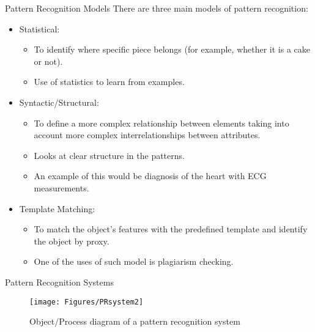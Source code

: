 \begin{frame}{Pattern Recognition Models}
There are three main models of pattern recognition:
\setlength{\itemsep}{12pt}
\begin{itemize}
\item {\color{mycolor1}Statistical:} 
\begin{itemize}
\item To identify where specific piece belongs (for example, whether it is a cake or not).
\item Use of statistics to learn from examples.
\end{itemize}
\item {\color{mycolor1}Syntactic/Structural:} 
\begin{itemize}
\item To define a more complex relationship between elements taking into account more complex interrelationships between attributes.
\item Looks at clear structure in the patterns.
\item An example of this would be diagnosis of the heart with ECG measurements.
\end{itemize}
\item {\color{mycolor1}Template Matching:}
\begin{itemize}
\item To match the object's features with the predefined template and identify the object by proxy. 
\item One of the uses of such model is plagiarism checking.
\end{itemize} 
\end{itemize}
\end{frame}

\begin{frame}{Pattern Recognition Systems}
\begin{figure}
\texttt{[image: Figures/PRsystem2]}
\caption{Object/Process diagram of a pattern recognition system}
\end{figure}
\end{frame}

